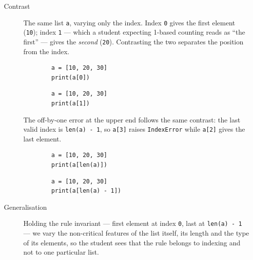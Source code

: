 \begin{description}
  \item[Contrast] The same list \texttt{a}, varying only the index.
    Index \texttt{0} gives the first element
    (\texttt{10}); index \texttt{1} --- which a student
    expecting 1-based counting reads as \enquote{the first} --- gives the
    \emph{second} (\texttt{20}). Contrasting the two separates the
    position from the index.

    \hfill
    \begin{minipage}[t]{0.45\columnwidth}
      \begin{verbatim}
        a = [10, 20, 30]
        print(a[0])
      \end{verbatim}
    \end{minipage}
    \hfill
    \begin{minipage}[t]{0.45\columnwidth}
      \begin{verbatim}
        a = [10, 20, 30]
        print(a[1])
      \end{verbatim}
    \end{minipage}
    \newline
    The off-by-one error at the upper end follows the same contrast: the last
    valid index is \texttt{len(a) - 1}, so \texttt{a[3]}
    raises \texttt{IndexError} while \texttt{a[2]} gives
    the last element.

    \hfill
    \begin{minipage}[t]{0.45\columnwidth}
      \begin{verbatim}
        a = [10, 20, 30]
        print(a[len(a)])
      \end{verbatim}
    \end{minipage}
    \hfill
    \begin{minipage}[t]{0.45\columnwidth}
      \begin{verbatim}
        a = [10, 20, 30]
        print(a[len(a) - 1])
      \end{verbatim}
    \end{minipage}

  \item[Generalisation] Holding the rule invariant --- first element at index
    \texttt{0}, last at \texttt{len(a) - 1} --- we vary
    the non-critical features of the list itself, its length and the type of its
    elements, so the student sees that the rule belongs to indexing and not to
    one particular list.


\end{description}
